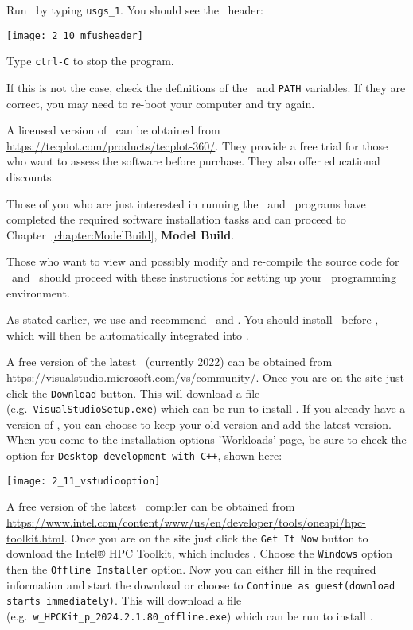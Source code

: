Run \mfus\ by typing \texttt{usgs\_1}.  You should see the \mfus\ header:

    \texttt{[image: 2\_10\_mfusheader]}

Type \texttt{ctrl-C} to stop the program.

If this is not the case, check the definitions of the \bin\ and {\tt PATH} variables.  If they are correct, you may need to re-boot your computer and try again.

A licensed version of \tecplot\ can be obtained from \url{https://tecplot.com/products/tecplot-360/}.  They provide a free trial for those who want to assess the software before purchase.  They also offer educational discounts.

Those of you who are just interested in running the \mut\ and \mfus\ programs have completed the required  software installation tasks and can proceed to Chapter~\ref{chapter:ModelBuild}, \textbf{Model Build}.

Those who want to view and possibly modify and re-compile the source code for \mut\ and \mfus\ should proceed with these instructions for setting up your \windows\ programming environment.

As stated earlier, we use and recommend \vstudio\ and \ifort. You should install \vstudio\ before \ifort, which will then be automatically integrated into \vstudio.

A free version of the latest \vstudio\ (currently 2022) can be obtained from \url{https://visualstudio.microsoft.com/vs/community/}. Once you are on the site just click the \texttt{Download} button.  This will download a file (e.g.\ \texttt{VisualStudioSetup.exe}) which can be run to install \vstudio.  If you already have a version of \vstudio, you can choose to keep your old version and add the latest version.  When you come to the installation options 'Workloads' page, be sure to check the option for \texttt{Desktop development with C++}, shown here:

\texttt{[image: 2\_11\_vstudiooption]}

A free version of the latest \ifort\ compiler can be obtained from \url{https://www.intel.com/content/www/us/en/developer/tools/oneapi/hpc-toolkit.html}.
Once you are on the site just click the \texttt{Get It Now} button to download the Intel® HPC Toolkit, which includes \ifort.  Choose the \texttt{Windows} option then the \texttt{Offline Installer} option. Now you can either fill in the required information and start the download or choose to \texttt{Continue as guest(download starts immediately)}.  This will download a file (e.g.\ \texttt{w\_HPCKit\_p\_2024.2.1.80\_offline.exe}) which can be run to install \ifort.

